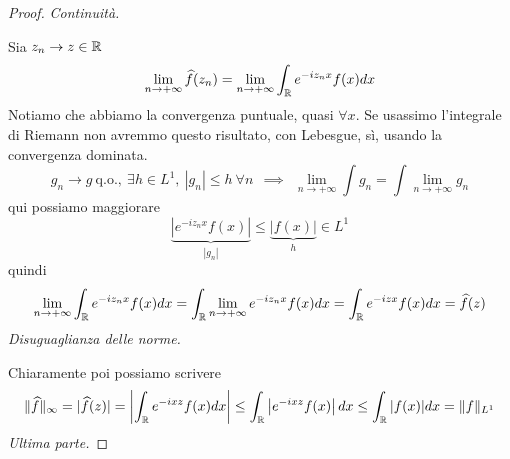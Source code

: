 \begin{proof}

\textit{Continuità.}

Sia $z_{n}\rightarrow z\in \mathbb{R}$
\begin{equation*}
\lim\limits_{n\rightarrow + \infty}\widehat{f}(z_{n}) = \lim\limits_{n\rightarrow + \infty}\int_{\mathbb{R}} e^{- iz_{n} x} f(x) dx
\end{equation*}
Notiamo che abbiamo la convergenza puntuale, quasi $\forall x$. Se usassimo l'integrale di Riemann non avremmo questo risultato, con Lebesgue, sì, usando la convergenza dominata.
\begin{equation*}
g_{n}\rightarrow g\ \text{q.o.}, \ \exists h\in L^{1}, \ | g_{n}| \leq h\ \forall n\ \ \implies \ \ \lim\limits_{n\rightarrow + \infty}\int g_{n} = \int \lim\limits_{n\rightarrow + \infty} g_{n}
\end{equation*}
qui possiamo maggiorare
\begin{equation*}
\underbrace{\left| e^{- iz_{n} x} f(x)\right|}_{| g_{n}|} \leq \underbrace{| f(x)|}_{h} \in L^{1}
\end{equation*}
quindi
\begin{equation*}
\lim\limits_{n\rightarrow + \infty}\int_{\mathbb{R}} e^{- iz_{n} x} f(x) dx = \int_{\mathbb{R}}\lim\limits_{n\rightarrow + \infty} e^{- iz_{n} x} f(x) dx = \int_{\mathbb{R}} e^{- izx} f(x) dx = \widehat{f}(z)
\end{equation*}
\textit{Disuguaglianza delle norme.}

Chiaramente poi possiamo scrivere
\begin{equation*}
\Vert \widehat{f} \Vert_{\infty} =| \widehat{f}(z)| = \left| \int_{\mathbb{R}} e^{- ixz} f(x) dx\right| \leq \int_{\mathbb{R}}\left| e^{- ixz} f(x)\right| dx\leq \int_{\mathbb{R}}| f(x)| dx = \Vert f \Vert_{L^{1}}
\end{equation*}
\textit{Ultima parte.}


\end{proof}
